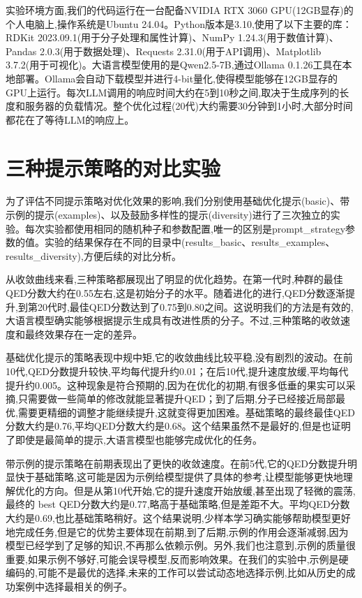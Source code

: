 实验环境方面,我们的代码运行在一台配备NVIDIA RTX 3060 GPU(12GB显存)的个人电脑上,操作系统是Ubuntu 24.04。Python版本是3.10,使用了以下主要的库：RDKit 2023.09.1(用于分子处理和属性计算)、NumPy 1.24.3(用于数值计算)、Pandas 2.0.3(用于数据处理)、Requests 2.31.0(用于API调用)、Matplotlib 3.7.2(用于可视化)。大语言模型使用的是Qwen2.5-7B,通过Ollama 0.1.26工具在本地部署。Ollama会自动下载模型并进行4-bit量化,使得模型能够在12GB显存的GPU上运行。每次LLM调用的响应时间大约在5到10秒之间,取决于生成序列的长度和服务器的负载情况。整个优化过程(20代)大约需要30分钟到1小时,大部分时间都花在了等待LLM的响应上。

\section{三种提示策略的对比实验}

为了评估不同提示策略对优化效果的影响,我们分别使用基础优化提示(basic)、带示例的提示(examples)、以及鼓励多样性的提示(diversity)进行了三次独立的实验。每次实验都使用相同的随机种子和参数配置,唯一的区别是prompt\_strategy参数的值。实验的结果保存在不同的目录中(results\_basic、results\_examples、results\_diversity),方便后续的对比分析。

从收敛曲线来看,三种策略都展现出了明显的优化趋势。在第一代时,种群的最佳QED分数大约在0.55左右,这是初始分子的水平。随着进化的进行,QED分数逐渐提升,到第20代时,最佳QED分数达到了0.75到0.80之间。这说明我们的方法是有效的,大语言模型确实能够根据提示生成具有改进性质的分子。不过,三种策略的收敛速度和最终效果存在一定的差异。

基础优化提示的策略表现中规中矩,它的收敛曲线比较平稳,没有剧烈的波动。在前10代,QED分数提升较快,平均每代提升约0.01；在后10代,提升速度放缓,平均每代提升约0.005。这种现象是符合预期的,因为在优化的初期,有很多低垂的果实可以采摘,只需要做一些简单的修改就能显著提升QED；到了后期,分子已经接近局部最优,需要更精细的调整才能继续提升,这就变得更加困难。基础策略的最终最佳QED分数大约是0.76,平均QED分数大约是0.68。这个结果虽然不是最好的,但是也证明了即使是最简单的提示,大语言模型也能够完成优化的任务。

带示例的提示策略在前期表现出了更快的收敛速度。在前5代,它的QED分数提升明显快于基础策略,这可能是因为示例给模型提供了具体的参考,让模型能够更快地理解优化的方向。但是从第10代开始,它的提升速度开始放缓,甚至出现了轻微的震荡,最终的 best QED分数大约是0.77,略高于基础策略,但是差距不大。平均QED分数大约是0.69,也比基础策略稍好。这个结果说明,少样本学习确实能够帮助模型更好地完成任务,但是它的优势主要体现在前期,到了后期,示例的作用会逐渐减弱,因为模型已经学到了足够的知识,不再那么依赖示例。另外,我们也注意到,示例的质量很重要,如果示例不够好,可能会误导模型,反而影响效果。在我们的实验中,示例是硬编码的,可能不是最优的选择,未来的工作可以尝试动态地选择示例,比如从历史的成功案例中选择最相关的例子。

